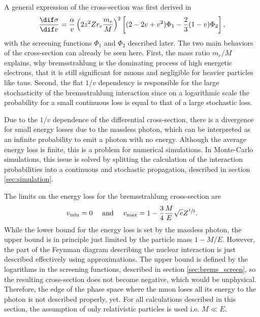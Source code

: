 A general expression of the cross-section was first derived in \cite{Bethe34}
\begin{align} \label{eq:brems}
\frac{\dif \sigma}{\dif v} =
    \frac{\alpha}{v} \left(2z^2Z r_e \frac{m_e}{M}\right)^2
    \left[ (2 - 2v + v^2) \Phi_1 - \frac{2}{3} (1 - v) \Phi_2 \right],
\end{align}
with the screening functions $\Phi_1$ and $\Phi_2$ described later.
The two main behaviors of the cross-section can already be seen here.
First, the mass ratio $m_e / M$ explains, why bremsstrahlung is the dominating process of high energetic electrons, that it is still significant for muons and negligible for heavier particles like taus.
Second, the flat $1/v$ dependency is responsible for the large stochasticity of the bremsstrahlung interaction since on a logarithmic scale the probability for a small continuous loss is equal to that of a large stochastic loss.

Due to the $1/v$ dependence of the differential cross-section, there is a divergence for small energy losses due to the massless photon, which can be interpreted as an infinite probability to emit a photon with no energy.
Although the average energy loss is finite, this is a problem for numerical simulations.
In Monte-Carlo simulations, this issue is solved by splitting the calculation of the interaction probabilities into a continuous and stochastic propagation, described in section \ref{sec:simulation}.

The limits on the energy loss for the bremsstrahlung cross-section are
\begin{align}
    v_{\text{min}} = 0
    \quad
    \text{ and }
    \quad
    v_{\text{max}} = 1 - \frac{3}{4}\frac{M}{E}\sqrt{e}Z^{\sfrac13}.
\end{align}
While the lower bound for the energy loss is set by the massless photon, the upper bound is in principle just limited by the particle mass $1-M/E$.
However, the part of the Feynman diagram describing the nuclear interaction is just described effectively using approximations.
The upper bound is defined by the logarithms in the screening functions, described in section \ref{sec:brems_screen}, so the resulting cross-section does not become negative, which would be unphysical.
Therefore, the edge of the phase space where the muon loses all its energy to the photon is not described properly, yet.
For all calculations described in this section, the assumption of only relativistic particles is used i.e. $M \ll E$.

